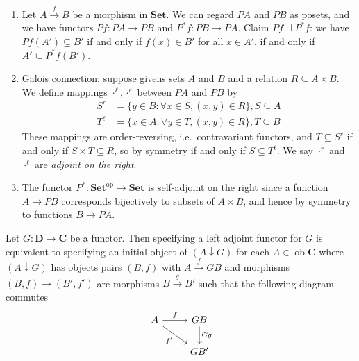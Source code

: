 \documentclass[a4paper]{article}
\renewcommand{\c}[1]{\mathbf{#1}}
\DeclareMathOperator{\ob}{ob}
\newcommand{\Set}{{\c{Set}}}
\newcommand{\adjoint}{\dashv}
\begin{document}
\begin{eg}
\begin{enumerate}
  \item Let \(A \xrightarrow{f} B\) be a morphism in \(\Set\). We can regard \(PA\) and \(PB\) as posets, and we have functors \(Pf: PA \to PB\) and \(P^*f: PB \to PA\). Claim \(Pf \adjoint P^*f\): we have \(Pf(A') \subseteq B'\) if and only if \(f(x) \in B'\) for all \(x \in A'\), if and only if \(A' \subseteq P^*f(B')\).
  \item Galois connection: suppose givens sets \(A\) and \(B\) and a relation \(R \subseteq A \times B\). We define mappings \(\cdot^\ell, \cdot^r\) between \(PA\) and \(PB\)  by
    \begin{align*}
      S^r &= \{y \in B: \forall x \in S, (x, y) \in R\}, S \subseteq A \\
      T^\ell &= \{x \in A: \forall y \in T, (x, y) \in R\}, T \subseteq B
    \end{align*}
    These mappings are order-reversing, i.e.\ contravariant functors, and \(T\subseteq S^r\) if and only if \(S \times T \subseteq R\), so by symmetry if and only if \(S \subseteq T^\ell\). We say \(\cdot^r\) and \(\cdot^\ell\) are \emph{adjoint on the right}.
  \item The functor \(P^*: \Set^{\text{op}} \to \Set\) is self-adjoint on the right since a function \(A \to PB\) corresponds bijectively to subsets of \(A \times B\), and hence by symmetry to functions \(B \to PA\). %
  \end{enumerate}
\end{eg}

\begin{theorem}
  \label{thm:unit-counit characterisation of adjunction}
  Let \(G: \c D \to \c C\) be a functor. Then specifying a left adjoint functor for \(G\) is equivalent to specifying an initial object of \((A \downarrow G)\) for each \(A \in \ob \c C\) where \((A \downarrow G)\) has objects pairs \((B, f)\) with \(A \xrightarrow{f} GB\) and morphisms \((B, f) \to (B', f')\) are morphisms \(B \xrightarrow{g} B'\) such that the following diagram commutes
  \[
    \begin{tikzcd}
      A \ar[r, "f"] \ar[dr, "f'"'] & GB \ar[d, "Gg"] \\
      & GB'
    \end{tikzcd}
  \]
\end{theorem}
\end{document}

